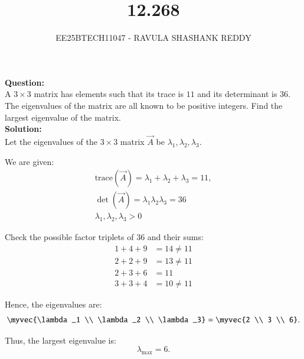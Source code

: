 \documentclass[journal]{article}
\begin{document}
	
	
	\vspace{3cm}
	
\title{12.268}
\author{EE25BTECH11047 - RAVULA SHASHANK REDDY}
\maketitle
\hrulefill
\bigskip 

\renewcommand{\thetable}{\theenumi}
\setlength{\intextsep}{10pt}

\textbf{Question:} \\

A $3 \times 3$ matrix has elements such that its trace is $11$ and its determinant is $36$. The eigenvalues of the matrix are all known to be positive integers. Find the largest eigenvalue of the matrix.\\

\textbf{Solution:}\\  

Let the eigenvalues of the $3 \times 3$ matrix $\vec{A}$ be $\lambda_1, \lambda_2, \lambda_3$.  

We are given:
\begin{align}
\text{trace}(\vec{A}) = \lambda_1 + \lambda_2 + \lambda_3 = 11,\\ 
\det(\vec{A}) = \lambda_1 \lambda_2 \lambda_3 = 36\\
\lambda_1, \lambda_2, \lambda_3 > 0
\end{align}

Check the possible factor triplets of 36 and their sums:
\begin{align}
1 + 4 + 9 &= 14 \not=11 \\
2 + 2 + 9 &= 13 \not=11\\
2 + 3 + 6 &= 11 \\
3 + 3 + 4 &= 10 \not=11
\end{align}

Hence, the eigenvalues are:
\begin{align}
\myvec{\lambda_1 \\ \lambda_2 \\ \lambda_3} = \myvec{2 \\ 3 \\ 6}.
\end{align}

Thus, the largest eigenvalue is:
\[
\lambda_{\max} = 6.
\]
\end{document}
